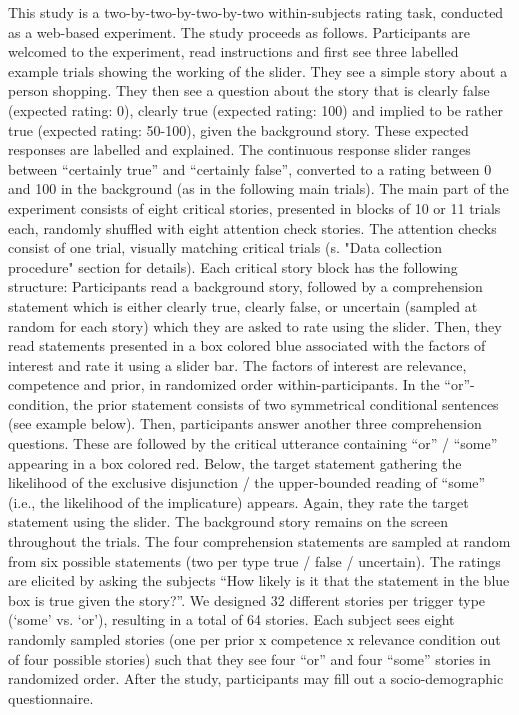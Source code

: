 \documentclass{sp}
\begin{document}
This study is a two-by-two-by-two-by-two within-subjects rating task, conducted as a web-based experiment. The study proceeds as follows.
Participants are welcomed to the experiment, read instructions and first see three labelled example trials showing the working of the slider. They see a simple story about a person shopping. They then see a question about the story that is clearly false (expected rating: 0), clearly true (expected rating: 100) and implied to be rather true (expected rating: 50-100), given the background story. These expected responses are labelled and explained. The continuous response slider ranges between “certainly true” and “certainly false”, converted to a rating between 0 and 100 in the background (as in the following main trials).   
The main part of the experiment consists of eight critical stories, presented in blocks of 10 or 11 trials each, randomly shuffled with eight attention check stories. The attention checks consist of one trial, visually matching critical trials (s. "Data collection procedure" section for details). 
Each critical story block has the following structure: Participants read a background story, followed by a comprehension statement which is either clearly true, clearly false, or uncertain (sampled at random for each story) which they are asked to rate using the slider. Then, they read statements presented in a box colored blue associated with the factors of interest and rate it using a slider bar. The factors of interest are relevance, competence and prior, in randomized order within-participants. In the “or”-condition, the prior statement consists of two symmetrical conditional sentences (see example below). Then, participants answer another three comprehension questions. These are followed by the critical utterance containing “or” / “some” appearing in a box colored red. Below, the target statement gathering the likelihood of the exclusive disjunction / the upper-bounded reading of “some” (i.e., the likelihood of the implicature) appears. Again, they rate the target statement using the slider. The background story remains on the screen throughout the trials. The four comprehension statements are sampled at random from six possible statements (two per type true / false / uncertain).
The ratings are elicited by asking the subjects “How likely is it that the statement in the blue box is true given the story?”.
We designed 32 different stories per trigger type (‘some’ vs. ‘or’), resulting in a total of 64 stories. Each subject sees eight randomly sampled stories (one per prior x competence x relevance condition out of four possible stories) such that they see four “or” and four “some” stories in randomized order.
After the study, participants may fill out a socio-demographic questionnaire.
\end{document}
